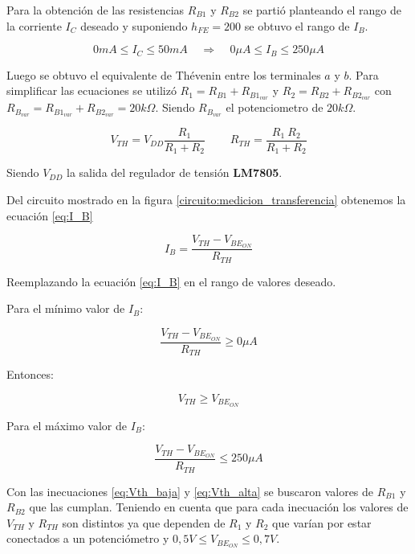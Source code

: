 \documentclass[10pt,spanish,a4paper,openany,notitlepage]{article}
\begin{document}
Para la obtención de las resistencias $R_{B1}$ y $R_{B2}$ se partió planteando el rango de la corriente $I_C$ deseado y suponiendo $h_{FE} = 200$ se obtuvo el rango de $I_B$.

\[ \displaystyle 0 \unit{mA} \leq I_C \leq 50\unit{mA} \ \ \ \ \ \Longrightarrow \ \ \ \ \  0 \unit{\mu A} \leq I_B \leq 250 \unit{\mu A} \]

Luego se obtuvo el equivalente de Thévenin entre los terminales $a$ y $b$. Para simplificar las ecuaciones se utilizó $R_1 = R_{B1} + R_{B1_{var}}$ y $R_2 = R_{B2} + R_{B2_{var}}$ con $R_{B_{var}} = R_{B1_{var}} + R_{B2_{var}} = 20 \unit{k\Omega}$. Siendo $R_{B_{var}}$ el potenciometro de $20 \unit{k\Omega}$.

\[ \displaystyle V_{TH} = V_{DD} \frac{R_1}{R_1 + R_2}\ \ \ \ \ \ \ \ \ \ R_{TH} = \frac{R_1\ R_2}{R_1 + R_2}\]

Siendo $V_{DD}$ la salida del regulador de tensión \textbf{LM7805}. 

Del circuito mostrado en la figura \ref{circuito:medicion_transferencia} obtenemos la ecuación \ref{eq:I_B}

\begin{equation}
\displaystyle I_B = \frac{V_{TH} - V_{BE_{ON}}}{R_{TH}}
\label{eq:I_B}
\end{equation}

Reemplazando la ecuación \ref{eq:I_B} en el rango de valores deseado.

Para el mínimo valor de $I_B$:

\[ \displaystyle \frac{V_{TH} - V_{BE_{ON}}}{R_{TH}} \geq 0 \unit{\mu A} \]

Entonces:

\begin{equation}
V_{TH} \geq V_{BE_{ON}}
\label{eq:Vth_baja}
\end{equation}

Para el máximo valor de $I_B$:

\begin{equation}
\frac{V_{TH} - V_{BE_{ON}}}{R_{TH}} \leq 250 \unit{\mu A}
\label{eq:Vth_alta}
\end{equation}

Con las inecuaciones \ref{eq:Vth_baja} y \ref{eq:Vth_alta} se buscaron valores de $R_{B1}$ y $R_{B2}$ que las cumplan. Teniendo en cuenta que para cada inecuación los valores de $V_{TH}$ y $R_{TH}$ son distintos ya que dependen de $R_1$ y $R_2$ que varían por estar conectados a un potenciómetro y $0,5 \unit{V} \leq V_{BE_{ON}} \leq 0,7 \unit{V}$.\\
\end{document}
